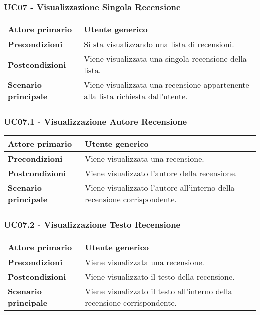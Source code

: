 \subsubsection{UC07 - Visualizzazione Singola Recensione}
\label{UC07}
\begin{center}
\renewcommand{\arraystretch}{1.5}
\begin{tabular}{ | m{10em} | m{20em} | }
    \hline
    \textbf{Attore primario} & Utente generico \\
    \hline
    \textbf{Precondizioni} & Si sta visualizzando una lista di recensioni. \\
    \hline
    \textbf{Postcondizioni} & Viene visualizzata una singola recensione della lista. \\
    \hline
    \textbf{Scenario principale} & Viene visualizzata una recensione appartenente alla lista richiesta dall'utente. \\
    \hline
   \end{tabular}
\end{center}

\subsubsection{UC07.1 - Visualizzazione Autore Recensione}
\label{UC07.1}
\begin{center}
\renewcommand{\arraystretch}{1.5}
\begin{tabular}{ | m{10em} | m{20em} | }
    \hline
    \textbf{Attore primario} & Utente generico \\
    \hline
    \textbf{Precondizioni} & Viene visualizzata una recensione. \\
    \hline
    \textbf{Postcondizioni} & Viene visualizzato l'autore della recensione. \\
    \hline
    \textbf{Scenario principale} & Viene visualizzato l'autore all'interno della recensione corrispondente. \\
    \hline
   \end{tabular}
\end{center}

\subsubsection{UC07.2 - Visualizzazione Testo Recensione}
\label{UC07.2}
\begin{center}
\renewcommand{\arraystretch}{1.5}
\begin{tabular}{ | m{10em} | m{20em} | }
    \hline
    \textbf{Attore primario} & Utente generico \\
    \hline
    \textbf{Precondizioni} & Viene visualizzata una recensione. \\
    \hline
    \textbf{Postcondizioni} & Viene visualizzato il testo della recensione. \\
    \hline
    \textbf{Scenario principale} & Viene visualizzato il testo all'interno della recensione corrispondente. \\
    \hline
   \end{tabular}
\end{center}

